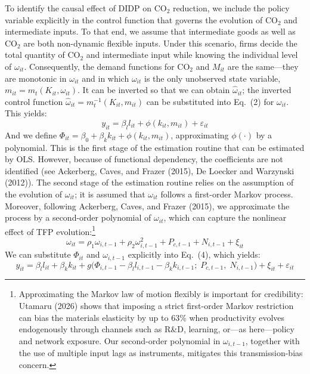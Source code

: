 \documentclass[11pt,a4paper]{article}
\begin{document}
To identify the causal effect of DIDP on CO$_2$ reduction, we include the policy variable explicitly in the control function that governs the evolution of CO$_2$ and intermediate inputs. To that end, we assume that intermediate goods as well as CO$_2$ are both non-dynamic flexible inputs. Under this scenario, firms decide the total quantity of CO$_2$ and intermediate input while knowing the individual level of $\omega_{it}$. Consequently, the demand functions for CO$_2$ and $M_{it}$ are the same---they are monotonic in $\omega_{it}$ and in which $\omega_{it}$ is the only unobserved state variable, $m_{it} = m_t(K_{it}, \omega_{it})$. It can be inverted so that we can obtain $\hat{\omega}_{it}$; the inverted control function $\hat{\omega}_{it} = m_t^{-1}(K_{it}, m_{it})$ can be substituted into Eq.~(2) for $\omega_{it}$. This yields:
\begin{equation}
y_{it} = \beta_l l_{it} + \phi(k_{it}, m_{it}) + \varepsilon_{it}
\end{equation}
And we define $\Phi_{it} = \beta_0 + \beta_k k_{it} + \phi(k_{it}, m_{it})$, approximating $\phi(\cdot)$ by a polynomial. This is the first stage of the estimation routine that can be estimated by OLS. However, because of functional dependency, the coefficients are not identified (see Ackerberg, Caves, and Frazer (2015), De Loecker and Warzynski (2012)). The second stage of the estimation routine relies on the assumption of the evolution of $\omega_{it}$; it is assumed that $\omega_{it}$ follows a first-order Markov process. Moreover, following Ackerberg, Caves, and Frazer (2015), we approximate the process by a second-order polynomial of $\omega_{it}$, which can capture the nonlinear effect of TFP evolution:\footnote{Approximating the Markov law of motion flexibly is important for credibility: Utamaru (2026) shows that imposing a strict first-order Markov restriction can bias the materials elasticity by up to 63\% when productivity evolves endogenously through channels such as R\&D, learning, or---as here---policy and network exposure. Our second-order polynomial in $\omega_{i,t-1}$, together with the use of multiple input lags as instruments, mitigates this transmission-bias concern.}
\begin{equation}
\omega_{it} = \rho_1 \omega_{i,t-1} + \rho_2 \omega_{i,t-1}^2 + P_{c,t-1} + N_{i,t-1} + \xi_{it}
\end{equation}
We can substitute $\Phi_{it}$ and $\omega_{i,t-1}$ explicitly into Eq.~(4), which yields:
\begin{equation}
y_{it} = \beta_l l_{it} + \beta_k k_{it} + g\bigl(\Phi_{i,t-1} - \beta_l l_{i,t-1} - \beta_k k_{i,t-1};\; P_{c,t-1},\; N_{i,t-1}\bigr) + \xi_{it} + \varepsilon_{it}
\end{equation}
\end{document}
